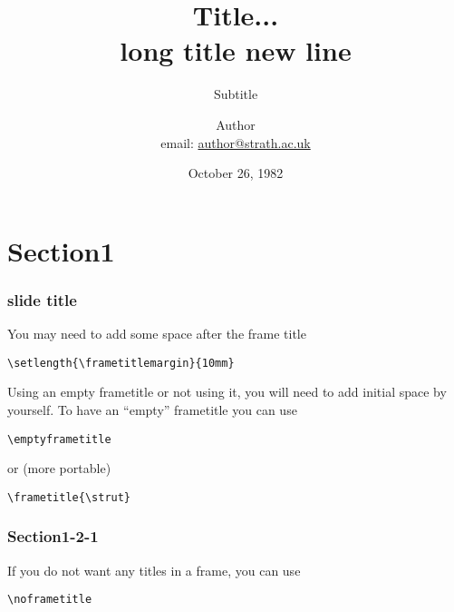 \documentclass[slidestop,compress,9pt]{beamer}
\title[Shorttitle]{\textbf{Title... \\ long title new line}}
\subtitle{Subtitle}
\author[Shortauthor]{Author \\ \small email: \href{mailto:author@strath.ac.uk}{author@strath.ac.uk}}
\institute{Department of blabla, University of Strathclyde}
\date[Oct 26]{October 26, 1982}
\begin{document}
\begin{frame}[plain]
\maketitle
\end{frame}



\begin{frame}
\tableofcontents
\end{frame}



\section{Section1}
\begin{frame}[fragile]
\frametitle{slide title}
You may need to add some space after the frame title
\begin{lstlisting}
\setlength{\frametitlemargin}{10mm}
\end{lstlisting}

\vskip 3mm
Using an empty frametitle or not using it, you will need to add initial space by yourself.
To have an ``empty'' frametitle you can use
\begin{lstlisting}
\emptyframetitle
\end{lstlisting}
or (more portable)
\begin{lstlisting}
\frametitle{\strut}
\end{lstlisting}
\end{frame}

\subsubsection{Section1-2-1}
\begin{frame}[fragile]
\noframetitle
If you do not want any titles in a frame, you can use
\begin{lstlisting}
\noframetitle
\end{lstlisting}
\end{frame}
\end{document}
